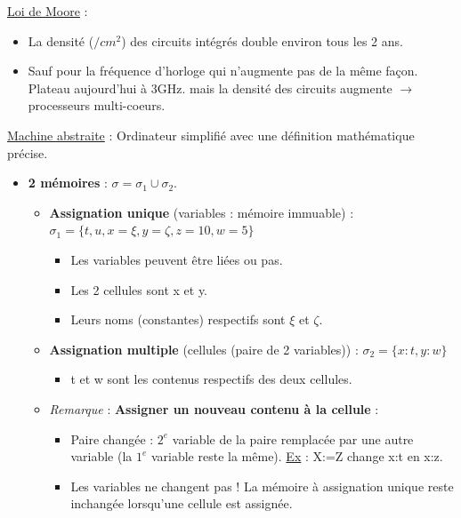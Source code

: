 \documentclass[fr,license=none]{../../../eplsummary}
\begin{document}
\begin{flushleft}
\textcolor{mauvedef}{\underline{Loi de Moore}} :

\begin{itemize}
\item La densité ($/cm^2$) des circuits intégrés double environ tous les 2 ans.
\item Sauf pour la fréquence d'horloge qui n'augmente pas de la même façon. Plateau aujourd'hui à 3GHz. mais la densité des circuits augmente $\rightarrow$ processeurs multi-coeurs.
\end{itemize} \bigbreak


\textcolor{mauvedef}{\underline{Machine abstraite}} : Ordinateur simplifié avec une définition mathématique précise.
\begin{itemize}

\item \textbf{2 mémoires} : \textcolor{miorangerouge}{$\sigma = \sigma_1 \cup \sigma_2$}.

\begin{itemize}[label=\textbullet]
\item \textbf{Assignation unique} (variables : mémoire immuable) : \textcolor{miorangerouge}{$\sigma_1 = \{t, u, x = \xi , y = \zeta , z = 10, w = 5 \}$}

\begin{itemize}[label=\circ]
\item Les variables peuvent être liées ou pas.
\item Les 2 cellules sont x et y.
\item Leurs noms (constantes) respectifs sont $\xi$ et $\zeta$.
\end{itemize}

\item \textbf{Assignation multiple} (cellules (paire de 2 variables)) : \textcolor{miorangerouge}{$\sigma_2 = \{ x:t , y:w \}$}

\begin{itemize}[label=\circ]
\item t et w sont les contenus respectifs des deux cellules.
\end{itemize}

\item \textit{Remarque} : \textbf{Assigner un nouveau contenu à la cellule} : 

\begin{itemize}[label=\circ]
\item Paire changée : $2^e$ variable de la paire remplacée par une autre variable (la $1^e$ variable reste la même). \underline{Ex} : X:=Z change x:t en x:z.
\item Les variables ne changent pas ! La mémoire à assignation unique reste inchangée lorsqu'une cellule est assignée.
\end{itemize}


\end{itemize}
\end{itemize}
\end{flushleft}
\end{document}
